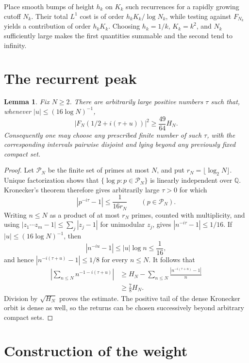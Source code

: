 \documentclass[11pt]{article}
\newtheorem{lemma}[theorem]{Lemma}
\begin{document}
Place smooth bumps of height $h_k$ on $K_k$ such recurrences for a rapidly
growing cutoff $N_k$.  Their total $L^1$ cost is of order
$h_kK_k/\log N_k$, while testing against $F_{N_k}$ yields a contribution of
order $h_kK_k$.  Choosing $h_k=1/k$, $K_k=k^2$, and $N_k$ sufficiently
large makes the first quantities summable and the second tend to infinity.

\section{The recurrent peak}

\begin{lemma}\label{lem:peak}
Fix $N\geq2$.  There are arbitrarily large positive numbers $\tau$ such
that, whenever $|u|\leq(16\log N)^{-1}$,
\[
 |F_N(1/2+i(\tau+u))|^2\geq \frac{49}{64}H_N.
\]
Consequently one may choose any prescribed finite number of such $\tau$,
with the corresponding intervals pairwise disjoint and lying beyond any
previously fixed compact set.
\end{lemma}

\begin{proof}
Let $\mathcal P_N$ be the finite set of primes at most $N$, and put
$r_N=\lfloor\log_2N\rfloor$.  Unique factorization shows that
$\{\log p:p\in\mathcal P_N\}$ is linearly independent over $\mathbb Q$.
Kronecker's theorem therefore gives arbitrarily large $\tau>0$ for which
\[
 |p^{-i\tau}-1|\leq\frac1{16r_N}
 \qquad(p\in\mathcal P_N).
\]
Writing $n\leq N$ as a product of at most $r_N$ primes, counted with
multiplicity, and using
$|z_1\cdots z_m-1|\leq\sum_j|z_j-1|$ for unimodular $z_j$, gives
$|n^{-i\tau}-1|\leq1/16$.  If
$|u|\leq(16\log N)^{-1}$, then
\[
 |n^{-iu}-1|\leq |u|\log n\leq\frac1{16},
\]
and hence $|n^{-i(\tau+u)}-1|\leq1/8$ for every $n\leq N$.  It follows that
\begin{align*}
 \left|\sum_{n\leq N}n^{-1-i(\tau+u)}\right|
 &\geq H_N-
 \sum_{n\leq N}\frac{|n^{-i(\tau+u)}-1|}{n}\\
 &\geq\frac78H_N.
\end{align*}
Division by $\sqrt{H_N}$ proves the estimate.  The positive tail of the
dense Kronecker orbit is dense as well, so the returns can be chosen
successively beyond arbitrary compact sets.
\end{proof}

\section{Construction of the weight}
\end{document}
